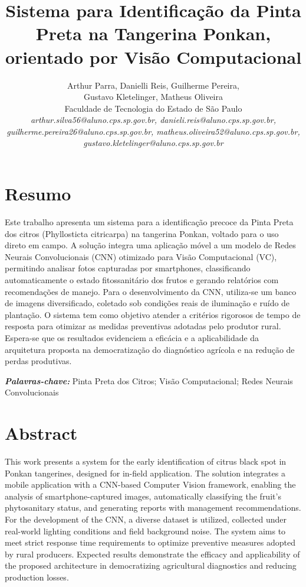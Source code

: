 \documentclass[11pt,a4paper]{article}
\title{\vspace{0.6cm}\textbf{\Large Sistema para Identificação da Pinta Preta na Tangerina Ponkan, orientado por Visão Computacional}}
\author{
    Arthur Parra, Danielli Reis, Guilherme Pereira, \\ Gustavo Kletelinger, Matheus Oliveira \\[0.3cm]
    \small
    Faculdade de Tecnologia do Estado de São Paulo \\[0.2cm]
    \textit{arthur.silva56@aluno.cps.sp.gov.br, danieli.reis@aluno.cps.sp.gov.br,}\\ \textit{guilherme.pereira26@aluno.cps.sp.gov.br, matheus.oliveira52@aluno.cps.sp.gov.br,}\\ \textit{gustavo.kletelinger@aluno.cps.sp.gov.br}
}
\date{}
\begin{document}
\pagestyle{fancy}

\maketitle
\thispagestyle{fancy}

\section*{Resumo}

Este trabalho apresenta um sistema para a identificação precoce da Pinta Preta dos citros (Phyllosticta citricarpa)  na tangerina Ponkan, voltado para o uso direto em campo. A solução integra uma aplicação móvel a um modelo de Redes Neurais Convolucionais (CNN) otimizado para Visão Computacional (VC), permitindo analisar fotos capturadas por smartphones, classificando automaticamente o estado fitossanitário dos frutos e gerando relatórios com recomendações de manejo. Para o desenvolvimento da CNN, utiliza-se um banco de imagens diversificado, coletado sob condições reais de iluminação e ruído de plantação. O sistema tem como objetivo atender a critérios rigorosos de tempo de resposta para otimizar as medidas preventivas adotadas pelo produtor rural. Espera-se que os resultados evidenciem a eficácia e a aplicabilidade da arquitetura proposta na democratização do diagnóstico agrícola e na redução de perdas produtivas.

\vspace{0.3cm}
\noindent\textit{\textbf{Palavras-chave:}} Pinta Preta dos Citros; Visão Computacional; Redes Neurais Convolucionais

\section*{Abstract}

This work presents a system for the early identification of citrus black spot in Ponkan tangerines, designed for in-field application. The solution integrates a mobile application with a CNN-based Computer Vision framework, enabling the analysis of smartphone-captured images, automatically classifying the fruit's phytosanitary status, and generating reports with management recommendations. For the development of the CNN, a diverse dataset is utilized, collected under real-world lighting conditions and field background noise. The system aims to meet strict response time requirements to optimize preventive measures adopted by rural producers. Expected results demonstrate the efficacy and applicability of the proposed architecture in democratizing agricultural diagnostics and reducing production losses.
\end{document}
